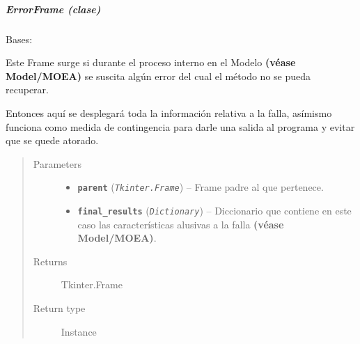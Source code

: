\documentclass[letterpaper,10pt,english]{sphinxmanual}
\begin{document}
\subparagraph{ErrorFrame (clase)}
\label{View/Additional/ResultsGrapher/ErrorFrame:errorframe-clase}\label{View/Additional/ResultsGrapher/ErrorFrame::doc}\label{View/Additional/ResultsGrapher/ErrorFrame:module-View.Additional.ResultsGrapher.ErrorFrame}

\begin{fulllineitems}
\label{View/Additional/ResultsGrapher/ErrorFrame:View.Additional.ResultsGrapher.ErrorFrame.ErrorFrame}
Bases: 

\begin{DUlineblock}{0em}
\item[] Este Frame surge si durante el proceso interno en el Modelo \textbf{(véase Model/MOEA)}
se suscita algún error del cual el método no se pueda recuperar.
\item[] Entonces aquí se desplegará toda la información relativa a la falla, asímismo
funciona como medida de contingencia para darle una salida al programa y evitar
que se quede atorado.
\end{DUlineblock}
\begin{quote}\begin{description}
\item[{Parameters}] \leavevmode\begin{itemize}
\item {} 
\textbf{\texttt{parent}} (\emph{\texttt{Tkinter.Frame}}) -- Frame padre al que pertenece.

\item {} 
\textbf{\texttt{final\_results}} (\emph{\texttt{Dictionary}}) -- Diccionario que contiene en este caso las características
alusivas a la falla \textbf{(véase Model/MOEA)}.

\end{itemize}

\item[{Returns}] \leavevmode
Tkinter.Frame

\item[{Return type}] \leavevmode
Instance

\end{description}\end{quote}

\end{fulllineitems}
\end{document}
